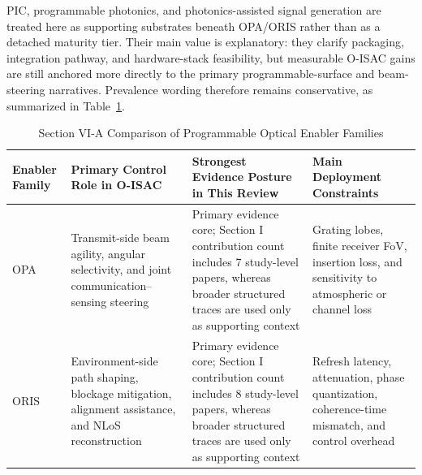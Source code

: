 \documentclass[letterpaper,journal]{IEEEtran}
\begin{document}
PIC, programmable photonics, and photonics-assisted signal generation are treated here as supporting substrates beneath OPA/ORIS rather than as a detached maturity tier. Their main value is explanatory: they clarify packaging, integration pathway, and hardware-stack feasibility, but measurable O-ISAC gains are still anchored more directly to the primary programmable-surface and beam-steering narratives. Prevalence wording therefore remains conservative, as summarized in Table~\ref{tab:vi_a_enablers}.



\begin{table}[!t]
    \caption{Section VI-A Comparison of Programmable Optical Enabler Families}
    \label{tab:vi_a_enablers}
    \centering
    \footnotesize
    \begin{tabularx}{\textwidth}{@{}%
        >{\raggedright\arraybackslash}p{2.0cm}
        >{\raggedright\arraybackslash}X
        >{\raggedright\arraybackslash}X
        >{\raggedright\arraybackslash}X
        @{}}
        \toprule
        \textbf{Enabler Family}                                                                                                                                  &
        \textbf{Primary Control Role in O-ISAC}                                                                                                                  &
        \textbf{Strongest Evidence Posture in This Review}                                                                                                       &
        \textbf{Main Deployment Constraints}                                                                                                                       \\
        \midrule

        OPA                                                                                                                                                      &
        Transmit-side beam agility, angular selectivity, and joint communication--sensing steering                                                               &
        Primary evidence core; Section I contribution count includes 7 study-level papers, whereas broader structured traces are used only as supporting context &
        Grating lobes, finite receiver FoV, insertion loss, and sensitivity to atmospheric or channel loss                                                         \\

        ORIS                                                                                                                                                     &
        Environment-side path shaping, blockage mitigation, alignment assistance, and NLoS reconstruction                                                        &
        Primary evidence core; Section I contribution count includes 8 study-level papers, whereas broader structured traces are used only as supporting context &
        Refresh latency, attenuation, phase quantization, coherence-time mismatch, and control overhead                                                            \\


\end{tabularx}
\end{table}
\end{document}
